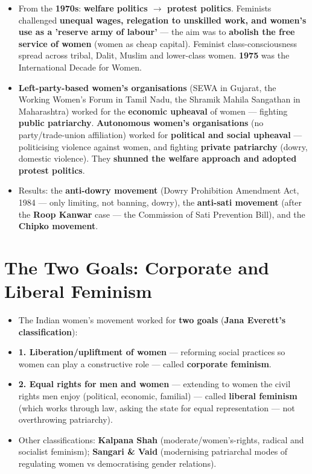 \begin{KeyConcept}
\begin{itemize}
\item From the \textbf{1970s}: \textbf{welfare politics $\rightarrow$ protest politics}. Feminists challenged \textbf{unequal wages, relegation to unskilled work, and women's use as a 'reserve army of labour'} --- the aim was to \textbf{abolish the free service of women} (women as cheap capital). Feminist class-consciousness spread across tribal, Dalit, Muslim and lower-class women. \textbf{1975} was the International Decade for Women.
\item \textbf{Left-party-based women's organisations} (SEWA in Gujarat, the Working Women's Forum in Tamil Nadu, the Shramik Mahila Sangathan in Maharashtra) worked for the \textbf{economic upheaval} of women --- fighting \textbf{public patriarchy}. \textbf{Autonomous women's organisations} (no party/trade-union affiliation) worked for \textbf{political and social upheaval} --- politicising violence against women, and fighting \textbf{private patriarchy} (dowry, domestic violence). They \textbf{shunned the welfare approach and adopted protest politics}.
\item Results: the \textbf{anti-dowry movement} (Dowry Prohibition Amendment Act, 1984 --- only limiting, not banning, dowry), the \textbf{anti-sati movement} (after the \textbf{Roop Kanwar} case --- the Commission of Sati Prevention Bill), and the \textbf{Chipko movement}.
\end{itemize}
\end{KeyConcept}

\section{The Two Goals: Corporate and Liberal Feminism}

\begin{KeyConcept}
\begin{itemize}
\item The Indian women's movement worked for \textbf{two goals} (\textbf{Jana Everett's classification}):
\item \textbf{1. Liberation/upliftment of women} --- reforming social practices so women can play a constructive role --- called \textbf{corporate feminism}.
\item \textbf{2. Equal rights for men and women} --- extending to women the civil rights men enjoy (political, economic, familial) --- called \textbf{liberal feminism} (which works through law, asking the state for equal representation --- not overthrowing patriarchy).
\item Other classifications: \textbf{Kalpana Shah} (moderate/women's-rights, radical and socialist feminism); \textbf{Sangari \& Vaid} (modernising patriarchal modes of regulating women vs democratising gender relations).
\end{itemize}
\end{KeyConcept}

